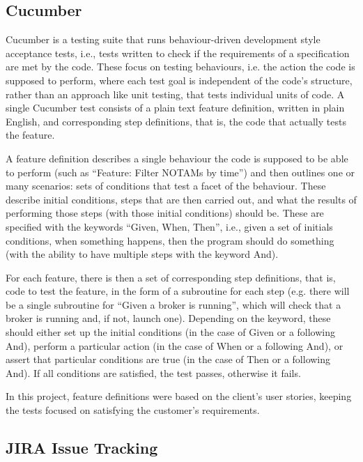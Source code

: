 \documentclass[a4paper, 12pt, twoside]{article}
\begin{document}
\subsection{Cucumber}
\label{sec:bg_cucumber}

Cucumber is a testing suite that runs behaviour-driven development style acceptance tests\cite{cucumber}, i.e., tests written to check if the requirements of a specification are met by the code. These focus on testing behaviours, i.e. the action the code is supposed to perform, where each test goal is independent of the code’s structure, rather than an approach like unit testing, that tests individual units of code.
A single Cucumber test consists of a plain text feature definition, written in plain English, and corresponding step definitions, that is, the code that actually tests the feature.

A feature definition describes a single behaviour the code is supposed to be able to perform (such as ``Feature: Filter NOTAMs by time'') and then outlines one or many scenarios: sets of conditions that test a facet of the behaviour. These describe initial conditions, steps that are then carried out, and what the results of performing those steps (with those initial conditions) should be. These are specified with the keywords ``Given, When, Then'', i.e., given a set of initials conditions, when something happens, then the program should do something (with the ability to have multiple steps with the keyword And).

For each feature, there is then a set of corresponding step definitions, that is, code to test the feature, in the form of a subroutine for each step (e.g. there will be a single subroutine for ``Given a broker is running'', which will check that a broker is running and, if not, launch one). Depending on the keyword, these should either set up the initial conditions (in the case of Given or a following And), perform a particular action (in the case of When or a following And), or assert that particular conditions are true (in the case of Then or a following And). If all conditions are satisfied, the test passes, otherwise it fails.

In this project, feature definitions were based on the client's user stories, keeping the tests focused on satisfying the customer's requirements.

\subsection{JIRA Issue Tracking}
\label{sec:bg_jira}
\end{document}
